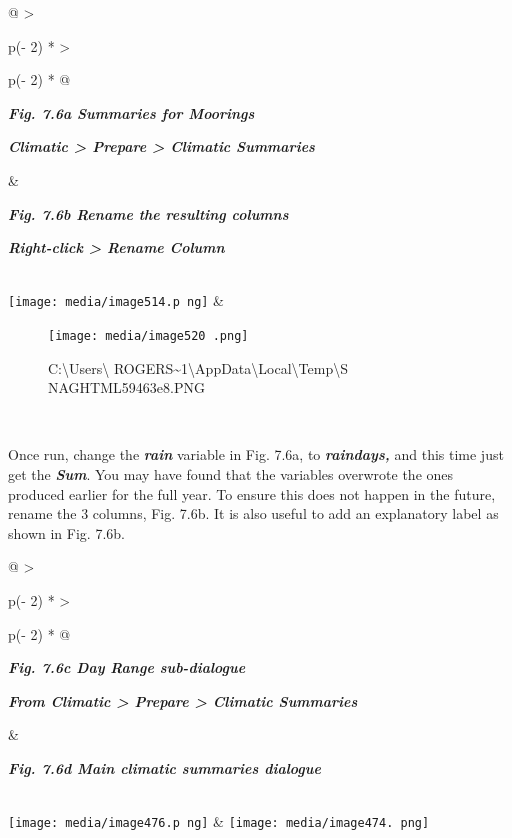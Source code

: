 \documentclass[
  letterpaper,
  DIV=11,
  numbers=noendperiod]{scrreprt}
\begin{document}
\begin{longtable}[]{@{}
  >{\raggedright\arraybackslash}p{(\columnwidth - 2\tabcolsep) * }
  >{\raggedright\arraybackslash}p{(\columnwidth - 2\tabcolsep) * }@{}}
\toprule\noalign{}
\begin{minipage}[b]{\linewidth}\raggedright
\textbf{\emph{Fig. 7.6a Summaries for Moorings}}

\textbf{\emph{Climatic \textgreater{} Prepare \textgreater{} Climatic
Summaries}}
\end{minipage} & \begin{minipage}[b]{\linewidth}\raggedright
\textbf{\emph{Fig. 7.6b Rename the resulting columns}}

\textbf{\emph{Right-click \textgreater{} Rename Column}}
\end{minipage} \\
\midrule\noalign{}
\endhead
\bottomrule\noalign{}
\endlastfoot
\texttt{[image: media/image514.p ng]}
& \begin{minipage}[t]{\linewidth}\raggedright
\begin{figure}[H]

{\centering \texttt{[image: media/image520 .png]}

}

\caption{C:\textbackslash Users\textbackslash{}
ROGERS\textasciitilde1\textbackslash AppData\textbackslash Local\textbackslash Temp\textbackslash S
NAGHTML59463e8.PNG}

\end{figure}%
\end{minipage} \\
\end{longtable}

Once run, change the \textbf{\emph{rain}} variable in Fig. 7.6a, to
\textbf{\emph{raindays,}} and this time just get the
\textbf{\emph{Sum}}. You may have found that the variables overwrote the
ones produced earlier for the full year. To ensure this does not happen
in the future, rename the 3 columns, Fig. 7.6b. It is also useful to add
an explanatory label as shown in Fig. 7.6b.

\begin{longtable}[]{@{}
  >{\raggedright\arraybackslash}p{(\columnwidth - 2\tabcolsep) * }
  >{\raggedright\arraybackslash}p{(\columnwidth - 2\tabcolsep) * }@{}}
\toprule\noalign{}
\begin{minipage}[b]{\linewidth}\raggedright
\textbf{\emph{Fig. 7.6c Day Range sub-dialogue}}

\textbf{\emph{From Climatic \textgreater{} Prepare \textgreater{}
Climatic Summaries}}
\end{minipage} & \begin{minipage}[b]{\linewidth}\raggedright
\textbf{\emph{Fig. 7.6d Main climatic summaries dialogue}}
\end{minipage} \\
\midrule\noalign{}
\endhead
\bottomrule\noalign{}
\endlastfoot
\texttt{[image: media/image476.p ng]}
&
\texttt{[image: media/image474. png]} \\
\end{longtable}
\end{document}
